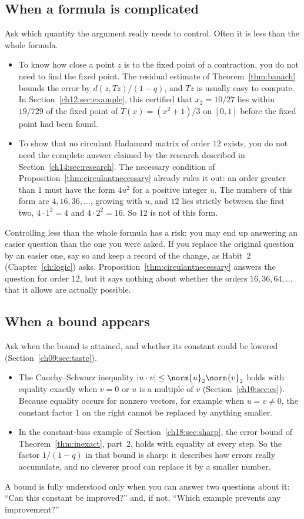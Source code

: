 \subsection*{When a formula is complicated}
Ask which quantity the argument really needs to control. Often it is less than the whole formula.
\begin{itemize}
\item To know how close a point $z$ is to the fixed point of a contraction, you do not need to find the fixed point. The residual estimate of Theorem~\ref{thm:banach} bounds the error by $d(z,Tz)/(1-q)$, and $Tz$ is usually easy to compute. In Section~\ref{ch12:sec:example}, this certified that $x_2=10/27$ lies within $19/729$ of the fixed point of $T(x)=(x^2+1)/3$ on $[0,1]$ before the fixed point had been found.
\item To show that no circulant Hadamard matrix of order $12$ exists, you do not need the complete answer claimed by the research described in Section~\ref{ch14:sec:research}. The necessary condition of Proposition~\ref{thm:circulantnecessary} already rules it out: an order greater than $1$ must have the form $4u^2$ for a positive integer $u$. The numbers of this form are $4,16,36,\ldots$, growing with $u$, and $12$ lies strictly between the first two, $4\cdot1^2=4$ and $4\cdot2^2=16$. So $12$ is not of this form.
\end{itemize}
Controlling less than the whole formula has a risk: you may end up answering an easier question than the one you were asked. If you replace the original question by an easier one, say so and keep a record of the change, as Habit~2 (Chapter~\ref{ch:logic}) asks. Proposition~\ref{thm:circulantnecessary} answers the question for order $12$, but it says nothing about whether the orders $16,36,64,\ldots$ that it allows are actually possible.

\subsection*{When a bound appears}
Ask when the bound is attained, and whether its constant could be lowered (Section~\ref{ch09:sec:taste}).
\begin{itemize}
\item The Cauchy--Schwarz inequality $|u\cdot v|\le\norm{u}_2\norm{v}_2$ holds with equality exactly when $v=0$ or $u$ is a multiple of $v$ (Section~\ref{ch10:sec:cs}). Because equality occurs for nonzero vectors, for example when $u=v\ne0$, the constant factor $1$ on the right cannot be replaced by anything smaller.
\item In the constant-bias example of Section~\ref{ch18:sec:sharp}, the error bound of Theorem~\ref{thm:inexact}, part~2, holds with equality at every step. So the factor $1/(1-q)$ in that bound is sharp: it describes how errors really accumulate, and no cleverer proof can replace it by a smaller number.
\end{itemize}
A bound is fully understood only when you can answer two questions about it: ``Can this constant be improved?'' and, if not, ``Which example prevents any improvement?''
